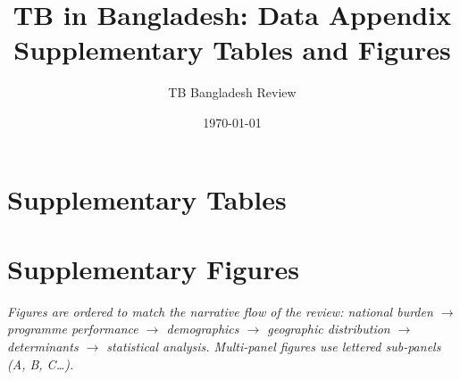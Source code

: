 \documentclass[12pt,a4paper]{article}
\title{TB in Bangladesh: Data Appendix\\
       \large Supplementary Tables and Figures}
\author{TB Bangladesh Review}
\date{\today}
\begin{document}
\maketitle
\tableofcontents
\clearpage

\section{Supplementary Tables}

\renewcommand{\thetable}{1A}

\clearpage

\addtocounter{table}{-1}%
\renewcommand{\thetable}{1B}

\renewcommand{\thetable}{\arabic{table}}%
\clearpage


\clearpage


\clearpage


\clearpage


\clearpage


\clearpage


\clearpage


\clearpage


\clearpage


\clearpage


\clearpage

\section{Supplementary Figures}
\noindent\textit{Figures are ordered to match the narrative flow of the review:
national burden $\to$ programme performance $\to$ demographics $\to$
geographic distribution $\to$ determinants $\to$ statistical analysis.
Multi-panel figures use lettered sub-panels (A, B, C\ldots).}
\bigskip
\end{document}
